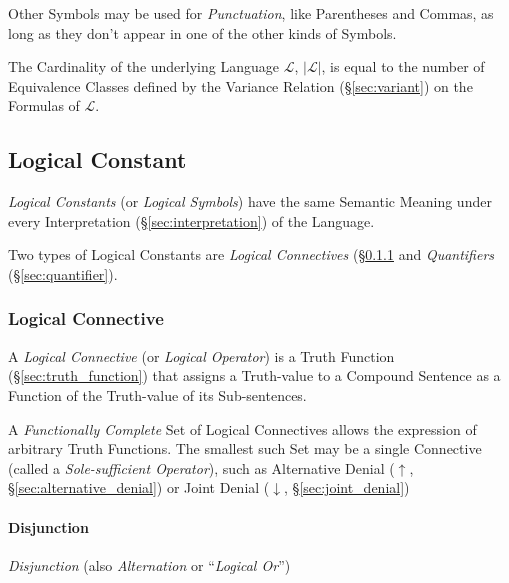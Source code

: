 Other Symbols may be used for \emph{Punctuation}, like Parentheses and
Commas, as long as they don't appear in one of the other kinds of
Symbols.

The Cardinality of the underlying Language $\mathcal{L}$,
$|\mathcal{L}|$, is equal to the number of Equivalence Classes defined
by the Variance Relation (\S\ref{sec:variant}) on the Formulas of
$\mathcal{L}$.



\subsection{Logical Constant}\label{sec:logical_constant}

\emph{Logical Constants} (or \emph{Logical Symbols}) have the same
Semantic Meaning under every Interpretation
(\S\ref{sec:interpretation}) of the Language.

Two types of Logical Constants are \emph{Logical Connectives}
(\S\ref{sec:logical_connective} and \emph{Quantifiers}
(\S\ref{sec:quantifier}).



\subsubsection{Logical Connective}\label{sec:logical_connective}

A \emph{Logical Connective} (or \emph{Logical Operator}) is a Truth
Function (\S\ref{sec:truth_function}) that assigns a Truth-value to a
Compound Sentence as a Function of the Truth-value of its
Sub-sentences.

A \emph{Functionally Complete} Set of Logical Connectives allows the
expression of arbitrary Truth Functions. The smallest such Set may be
a single Connective (called a \emph{Sole-sufficient Operator}), such
as Alternative Denial ($\uparrow$, \S\ref{sec:alternative_denial}) or
Joint Denial ($\downarrow$, \S\ref{sec:joint_denial})



\paragraph{Disjunction}\label{sec:disjunction}\hfill

\emph{Disjunction} (also \emph{Alternation} or ``\emph{Logical Or}'')

